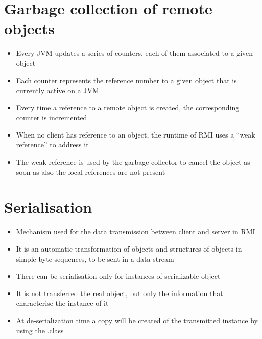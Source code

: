 \section{Garbage collection of remote objects}
\begin{itemize}
    \item Every JVM updates a series of counters, each of them associated to a given object
    \item Each counter represents the reference number to a given object that is currently active on a JVM
    \item Every time a reference to a remote object is created, the corresponding counter is incremented
    \item When no client has reference to an object, the runtime of RMI uses a “weak reference” to address it 
    \item The weak reference is used by the garbage collector to cancel the object as soon as also the local references are not present
\end{itemize}

\section{Serialisation}
\begin{itemize}
    \item Mechanism used for the data transmission between client and server in RMI 
    \item It is an automatic transformation of objects and structures of objects in simple byte sequences, to be sent in a data stream
    \item There can be serialisation only for instances of serializable object
    \item It is not transferred the real object, but only the information that characterise the instance of it
    \item At de-serialization time a copy will be created of the transmitted instance by using the .class
\end{itemize}